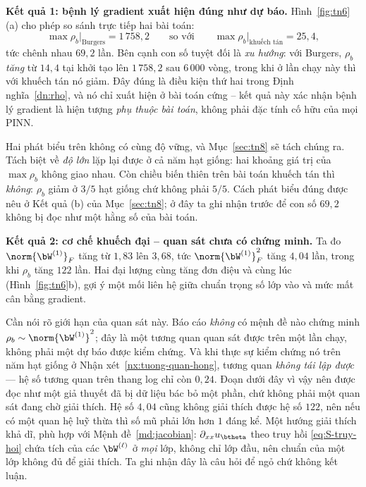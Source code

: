 \textbf{Kết quả 1: bệnh lý gradient xuất hiện đúng như dự báo.}
Hình~\ref{fig:tn6}(a) cho phép so sánh trực tiếp hai bài toán:
\begin{equation}
\max\rho_b\big|_{\text{Burgers}} = 1\,758{,}2
\qquad\text{so với}\qquad
\max\rho_b\big|_{\text{khuếch tán}} = 25{,}4,
\label{eq:so-sanh-rho}
\end{equation}
tức chênh nhau $69{,}2$ lần. Bên cạnh con số tuyệt đối là \emph{xu hướng}:
với Burgers, $\rho_b$ \emph{tăng} từ $14{,}4$ tại khởi tạo lên $1\,758{,}2$ sau
$6\,000$ vòng, trong khi ở lần chạy này thì với khuếch tán nó giảm. Đây đúng là
điều kiện thứ hai trong Định nghĩa~\ref{dn:rho}, và nó chỉ xuất hiện ở bài toán
cứng -- kết quả này xác nhận bệnh lý gradient là hiện tượng \emph{phụ thuộc bài
toán}, không phải đặc tính cố hữu của mọi PINN.

Hai phát biểu trên không có cùng độ vững, và Mục~\ref{sec:tn8} sẽ tách chúng ra.
Tách biệt về \emph{độ lớn} lặp lại được ở cả năm hạt giống: hai khoảng giá trị
của $\max\rho_b$ không giao nhau. Còn chiều biến thiên trên bài toán khuếch tán
thì \emph{không}: $\rho_b$ giảm ở $3/5$ hạt giống chứ không phải $5/5$. Cách
phát biểu đúng được nêu ở Kết quả (b) của Mục~\ref{sec:tn8}; ở đây ta ghi nhận
trước để con số $69{,}2$ không bị đọc như một hằng số của bài toán.
 
\textbf{Kết quả 2: cơ chế khuếch đại -- quan sát chưa có chứng minh.} Ta đo
$\norm{\bW^{(1)}}_F$ tăng từ $1{,}83$ lên $3{,}68$, tức
$\norm{\bW^{(1)}}_F^2$ tăng $4{,}04$ lần, trong khi $\rho_b$ tăng $122$ lần. Hai
đại lượng cùng tăng đơn điệu và cùng lúc (Hình~\ref{fig:tn6}b), gợi ý một mối liên
hệ giữa chuẩn trọng số lớp vào và mức mất cân bằng gradient.
 
Cần nói rõ giới hạn của quan sát này. Báo cáo \emph{không} có mệnh đề nào chứng
minh $\rho_b \sim \norm{\bW^{(1)}}^2$; đây là một tương quan quan sát được trên
một lần chạy, không phải một dự báo được kiểm chứng. Và khi thực sự kiểm chứng
nó trên năm hạt giống ở Nhận xét~\ref{nx:tuong-quan-hong}, tương quan \emph{không
tái lập được} --- hệ số tương quan trên thang log chỉ còn $0{,}24$. Đoạn dưới đây
vì vậy nên được đọc như một giả thuyết đã bị dữ liệu bác bỏ một phần, chứ không
phải một quan sát đang chờ giải thích. Hệ số $4{,}04$ cũng không
giải thích được hệ số $122$, nên nếu có một quan hệ luỹ thừa thì số mũ phải lớn
hơn $1$ đáng kể. Một hướng giải thích khả dĩ, phù hợp với
Mệnh đề~\ref{md:jacobian}: $\partial_{xx}u_{\btheta}$ theo truy hồi
\eqref{eq:S-truy-hoi} chứa tích của các $\bW^{(\ell)}$ ở \emph{mọi} lớp, không chỉ
lớp đầu, nên chuẩn của một lớp không đủ để giải thích. Ta ghi nhận đây là câu hỏi
để ngỏ chứ không kết luận.
 

